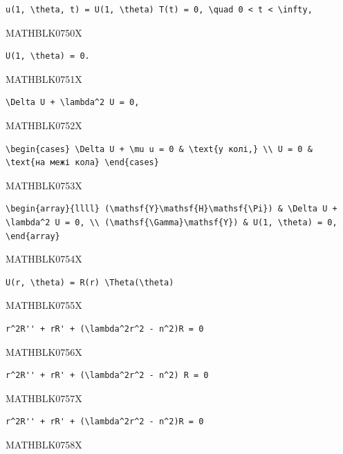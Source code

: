 \documentclass[
  ukrainian,
]{article}
\begin{document}
\begin{verbatim}
u(1, \theta, t) = U(1, \theta) T(t) = 0, \quad 0 < t < \infty,
\end{verbatim}

MATHBLK0750X

\begin{verbatim}
U(1, \theta) = 0.
\end{verbatim}

MATHBLK0751X

\begin{verbatim}
\Delta U + \lambda^2 U = 0,
\end{verbatim}

MATHBLK0752X

\begin{verbatim}
\begin{cases} \Delta U + \mu u = 0 & \text{у колі,} \\ U = 0 & \text{на межі кола} \end{cases}
\end{verbatim}

MATHBLK0753X

\begin{verbatim}
\begin{array}{llll} (\mathsf{Y}\mathsf{H}\mathsf{\Pi}) & \Delta U + \lambda^2 U = 0, \\ (\mathsf{\Gamma}\mathsf{Y}) & U(1, \theta) = 0, \end{array}
\end{verbatim}

MATHBLK0754X

\begin{verbatim}
U(r, \theta) = R(r) \Theta(\theta)
\end{verbatim}

MATHBLK0755X

\begin{verbatim}
r^2R'' + rR' + (\lambda^2r^2 - n^2)R = 0
\end{verbatim}

MATHBLK0756X

\begin{verbatim}
r^2R'' + rR' + (\lambda^2r^2 - n^2) R = 0
\end{verbatim}

MATHBLK0757X

\begin{verbatim}
r^2R'' + rR' + (\lambda^2r^2 - n^2)R = 0
\end{verbatim}

MATHBLK0758X
\end{document}

